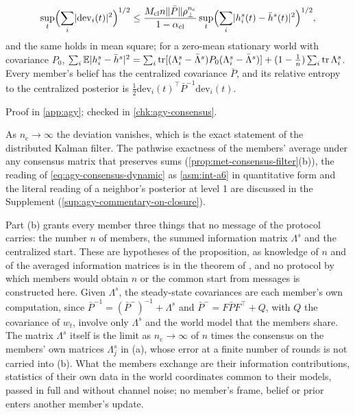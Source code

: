 \begin{proposition}
\begin{enumerate}
\begin{equation}
\sup_t\Bigl(\sum_i\lvert\mathrm{dev}_i(t)\rvert^2\Bigr)^{1/2}\le\frac{M_{\mathrm{cl}}n\Vert\bar P\Vert\rho_\perp^{n_{\mathrm c}}}{1-\alpha_{\mathrm{cl}}}\sup_t\Bigl(\sum_i\lvert h^s_i(t)-\bar h^s(t)\rvert^2\Bigr)^{1/2},
\end{equation}
and the same holds in mean square; for a zero-mean stationary world with covariance $P_0$, $\sum_i\mathbb{E}\lvert h^s_i-\bar h^s\rvert^2=\sum_i\operatorname{tr}[(\Lambda^s_i-\bar\Lambda^s)P_0(\Lambda^s_i-\bar\Lambda^s)]+(1-\frac1n)\sum_i\operatorname{tr}\Lambda^s_i$. Every member's belief has the centralized covariance $\bar P$, and its relative entropy to the centralized posterior is $\frac12\mathrm{dev}_i(t)^\top\bar P^{-1}\mathrm{dev}_i(t)$.
\end{enumerate}
Proof in \cref{app:agy}; checked in \cref{chk:agy-consensus}.
\end{proposition}

As $n_{\mathrm c}\to\infty$ the deviation vanishes, which is the exact statement of the distributed Kalman filter. The pathwise exactness of the members' average under any consensus matrix that preserves sums (\cref{prop:met-consensus-filter}(b)), the reading of \eqref{eq:agy-consensus-dynamic} as \cref{asm:int-a6} in quantitative form and the literal reading of a neighbor's posterior at level 1 are discussed in the Supplement (\cref{sup:agy-commentary-on-closure}).

Part (b) grants every member three things that no message of the protocol carries: the number $n$ of members, the summed information matrix $\Lambda^s$ and the centralized start. These are hypotheses of the proposition, as knowledge of $n$ and of the averaged information matrices is in the theorem of \citet{olfatisaber2005distributed}, and no protocol by which members would obtain $n$ or the common start from messages is constructed here. Given $\Lambda^s$, the steady-state covariances are each member's own computation, since $\bar P^{-1}=(\bar P^-)^{-1}+\Lambda^s$ and $\bar P^-=F\bar PF^\top+Q$, with $Q$ the covariance of $w_t$, involve only $\Lambda^s$ and the world model that the members share. The matrix $\Lambda^s$ itself is the limit as $n_{\mathrm c}\to\infty$ of $n$ times the consensus on the members' own matrices $\Lambda^s_j$ in (a), whose error at a finite number of rounds is not carried into (b). What the members exchange are their information contributions, statistics of their own data in the world coordinates common to their models, passed in full and without channel noise; no member's frame, belief or prior enters another member's update.

